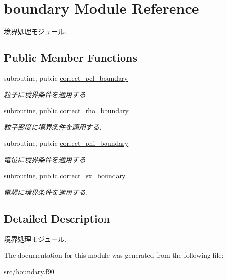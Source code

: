 \hypertarget{classboundary}{\section{boundary Module Reference}
\label{classboundary}
}


境界処理モジュール.  


\subsection*{Public Member Functions}
\begin{DoxyCompactItemize}
\item 
\hypertarget{classboundary_afbb452d63d91c42812952b8af1f22ca6}{subroutine, public \hyperlink{classboundary_afbb452d63d91c42812952b8af1f22ca6}{correct\-\_\-pcl\-\_\-boundary}}\label{classboundary_afbb452d63d91c42812952b8af1f22ca6}

\begin{DoxyCompactList}\small\item\em 粒子に境界条件を適用する. \end{DoxyCompactList}\item 
\hypertarget{classboundary_a4712bf2ca22b6b30c0096216e1139e0c}{subroutine, public \hyperlink{classboundary_a4712bf2ca22b6b30c0096216e1139e0c}{correct\-\_\-rho\-\_\-boundary}}\label{classboundary_a4712bf2ca22b6b30c0096216e1139e0c}

\begin{DoxyCompactList}\small\item\em 粒子密度に境界条件を適用する. \end{DoxyCompactList}\item 
\hypertarget{classboundary_a75a52316913476e2a7ce01191c627a01}{subroutine, public \hyperlink{classboundary_a75a52316913476e2a7ce01191c627a01}{correct\-\_\-phi\-\_\-boundary}}\label{classboundary_a75a52316913476e2a7ce01191c627a01}

\begin{DoxyCompactList}\small\item\em 電位に境界条件を適用する. \end{DoxyCompactList}\item 
\hypertarget{classboundary_a3739221fe7bced68a44f9977acc464cf}{subroutine, public \hyperlink{classboundary_a3739221fe7bced68a44f9977acc464cf}{correct\-\_\-ex\-\_\-boundary}}\label{classboundary_a3739221fe7bced68a44f9977acc464cf}

\begin{DoxyCompactList}\small\item\em 電場に境界条件を適用する. \end{DoxyCompactList}\end{DoxyCompactItemize}


\subsection{Detailed Description}
境界処理モジュール. 

The documentation for this module was generated from the following file\-:\begin{DoxyCompactItemize}
\item 
src/boundary.\-f90\end{DoxyCompactItemize}
